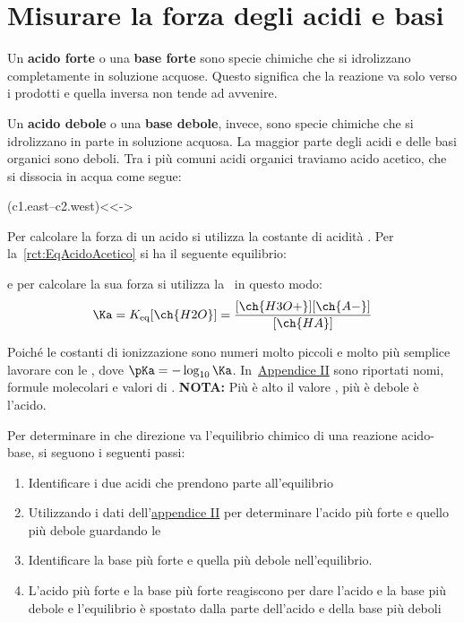 \section{Misurare la forza degli acidi e basi}
Un \textbf{acido forte} o una \textbf{base forte} sono specie chimiche che si idrolizzano completamente in soluzione acquose. Questo significa che la reazione va solo verso i prodotti e quella inversa non tende ad avvenire.

Un \textbf{acido debole} o una \textbf{base debole}, invece, sono specie chimiche che si idrolizzano in parte in soluzione acquosa. La maggior parte degli acidi e delle basi organici sono deboli. Tra i più comuni acidi organici traviamo acido acetico, che si dissocia in acqua come segue:

\begingroup
\begin{reaction}
	 \+  
	\arrow(c1.east--c2.west){<<->}
	 \+ 
\end{reaction}
\label{rct:EqAcidoAcetico}
\endgroup

Per calcolare la forza di un acido si utilizza la costante di acidità \Ka. Per la~\autoref{rct:EqAcidoAcetico} si ha il seguente equilibrio:

\begin{center}
\end{center}
e per calcolare la sua forza si utilizza la \Ka\ in questo modo:
\begin{equation*}
	\Ka = K_{\text{eq}}[\ch{H2O}] = \frac{[\ch{H3O+}][\ch{A-}]}{[\ch{HA}]}
\end{equation*}

Poiché le costanti di ionizzazione sono numeri molto piccoli e molto più semplice lavorare con le \pKa, dove \(\pKa=-\log_{10} \Ka\). In~\hyperref[ap:acidi.basi]{Appendice II} sono riportati nomi, formule molecolari e valori di \pKa. \textbf{NOTA:} Più è alto il valore \pKa, più è debole è l'acido.

Per determinare in che direzione va l'equilibrio chimico di una reazione acido-base, si seguono i seguenti passi:
\begin{enumerate}
	\item Identificare i due acidi che prendono parte all'equilibrio
	\item Utilizzando i dati dell'\hyperref[ap:acidi.basi]{appendice II} per determinare l'acido più forte e quello più debole guardando le \Ka
	\item Identificare la base più forte e quella più debole nell'equilibrio.
	\item L'acido più forte e la base più forte reagiscono per dare l'acido e la base più debole e l'equilibrio è spostato dalla parte dell'acido e della base più deboli
\end{enumerate}